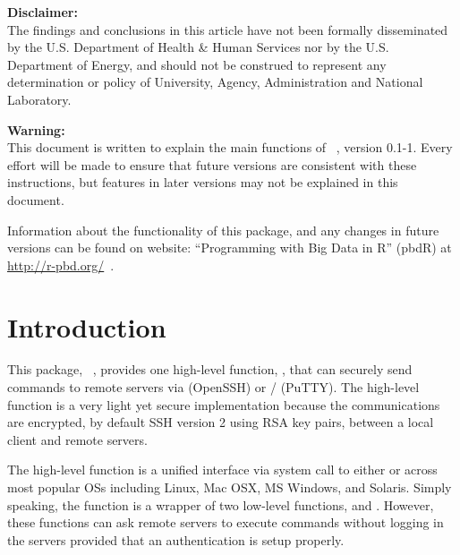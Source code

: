 
{\color{red} \bf Disclaimer:}\\
The findings and conclusions in this article have not been
formally disseminated by the U.S. Department of Health \& Human Services
nor by the U.S. Department of Energy,
and should not be construed to represent any determination or
policy of University, Agency, Administration and National Laboratory.

{\color{red} \bf Warning:}\\
This document is written to explain the main
functions of ~\citep{Chen2017pbdRPCpackage}, version 0.1-1.
Every effort will be made to ensure that future versions are consistent with
these instructions, but features in later versions may not be explained
in this document.

Information about the functionality of this package,
and any changes in future versions can be found on website:
``Programming with Big Data in R'' (pbdR) at
\url{http://r-pbd.org/}~\citep{pbdR2012}.




\section[Introduction]{Introduction}
\label{sec:introduction}

This package, ~\citep{Chen2017pbdRPCpackage},
provides one high-level function, , that can securely send
commands to remote servers via  (OpenSSH) or
/ (PuTTY).
The high-level function is a very light yet secure implementation because
the communications are encrypted, by default SSH version 2 using RSA key pairs,
between a local client and remote servers.

The high-level function  is a unified interface via system call
to either  or  across most popular OSs
including Linux, Mac OSX, MS Windows, and Solaris.
Simply speaking, the function  is a wrapper
of two low-level functions,  and .
However, these functions can ask remote servers to execute commands without
logging in the servers provided that an authentication is setup properly.

